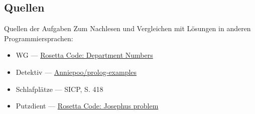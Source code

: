 \documentclass{beamer}
\begin{document}
\subsection{Quellen}

\begin{frame}{Quellen der Aufgaben}
	Zum Nachlesen und Vergleichen mit Lösungen in anderen Programmiersprachen:
	\begin{itemize}
		\item WG --- \href{https://rosettacode.org/wiki/Department_Numbers}{Rosetta Code: Department Numbers}
		\item Detektiv --- \href{https://github.com/Anniepoo/prolog-examples/blob/master/newdetective.pl}{Anniepoo/prolog-examples}
		\item Schlafplätze --- SICP, S. 418
		\item Putzdient --- \href{https://rosettacode.org/wiki/Josephus_problem}{Rosetta Code: Josephus problem}
	\end{itemize}
\end{frame}

\end{document}
